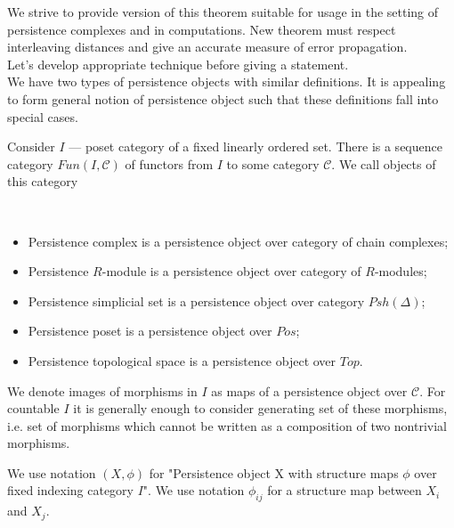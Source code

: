 We strive to provide version of this theorem suitable for usage in the setting of persistence complexes and in computations. New theorem must respect interleaving distances and give an accurate measure of error propagation.\\
Let's develop appropriate technique before giving a statement.\\

We have two types of persistence objects with similar definitions. It is appealing to form general notion of persistence object such that these definitions fall into special cases.\\

\begin{definition}
  Consider $I$ --- poset category of a fixed linearly ordered set. There is a sequence category $Fun(I, \mathcal{C})$ of functors from $I$ to some category $\mathcal{C}$. We call objects of this category 
\end{definition}

\begin{example} ~ \par
  \begin{itemize}
    \item Persistence complex is a persistence object over category of chain complexes;
    \item Persistence $R$-module is a persistence object over category of $R$-modules;
    \item Persistence simplicial set is a persistence object over category $Psh(\Delta)$;
    \item Persistence poset is a persistence object over $Pos$;
    \item Persistence topological space is a persistence object over $Top$.
  \end{itemize}
\end{example}

\begin{definition}
  We denote images of morphisms in $I$ as  maps of a persistence object over $\mathcal{C}$. For countable $I$ it is generally enough to consider generating set of these morphisms, i.e. set of morphisms which cannot be written as a composition of two nontrivial morphisms.
\end{definition}

We use notation $(X,\phi)$ for "Persistence object X with structure maps $\phi$ over fixed indexing category $I$". We use notation $\phi_{ij}$ for a structure map between $X_i$ and $X_{j}$.\\

